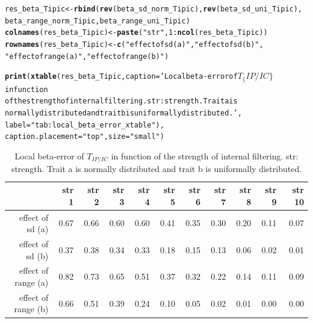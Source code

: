 \documentclass[12pt]{article}\usepackage[]{graphicx}\usepackage[]{color}
\makeatletter
\newcommand{\hlnum}[1]{\textcolor[rgb]{0.686,0.059,0.569}{#1}}%
\newcommand{\hlstr}[1]{\textcolor[rgb]{0.192,0.494,0.8}{#1}}%
\newcommand{\hlopt}[1]{\textcolor[rgb]{0,0,0}{#1}}%
\newcommand{\hlstd}[1]{\textcolor[rgb]{0.345,0.345,0.345}{#1}}%
\newcommand{\hlkwb}[1]{\textcolor[rgb]{0.69,0.353,0.396}{#1}}%
\newcommand{\hlkwc}[1]{\textcolor[rgb]{0.333,0.667,0.333}{#1}}%
\newcommand{\hlkwd}[1]{\textcolor[rgb]{0.737,0.353,0.396}{\textbf{#1}}}%
\newenvironment{kframe}{%
 \def\at@end@of@kframe{}%
 \ifinner\ifhmode%
  \def\at@end@of@kframe{\end{minipage}}%
  \begin{minipage}{\columnwidth}%
 \fi\fi%
 \def\FrameCommand##1{\hskip\@totalleftmargin \hskip-\fboxsep
 \colorbox{shadecolor}{##1}\hskip-\fboxsep
     \hskip-\linewidth \hskip-\@totalleftmargin \hskip\columnwidth}%
 \MakeFramed {\advance\hsize-\width
   \@totalleftmargin\z@ \linewidth\hsize
   \@setminipage}}%
 {\par\unskip\endMakeFramed%
 \at@end@of@kframe}
\newenvironment{knitrout}{}{} %
\makeatother
\begin{document}
\begin{knitrout}
\begin{kframe}
\begin{alltt}
\hlstd{res_beta_Tipic} \hlkwb{<-} \hlkwd{rbind}\hlstd{(}\hlkwd{rev}\hlstd{(beta_sd_norm_Tipic),} \hlkwd{rev}\hlstd{(beta_sd_uni_Tipic),}
      \hlstd{beta_range_norm_Tipic, beta_range_uni_Tipic)}
\hlkwd{colnames}\hlstd{(res_beta_Tipic)} \hlkwb{<-} \hlkwd{paste}\hlstd{(}\hlstr{"str"}\hlstd{,} \hlnum{1}\hlopt{:}\hlkwd{ncol}\hlstd{(res_beta_Tipic))}
\hlkwd{rownames}\hlstd{(res_beta_Tipic)} \hlkwb{<-} \hlkwd{c}\hlstd{(}\hlstr{"effect of sd (a)"}\hlstd{,} \hlstr{"effect of sd (b)"}\hlstd{,}
        \hlstr{"effect of range (a)"}\hlstd{,} \hlstr{"effect of range (b)"}\hlstd{)}
\end{alltt}
\end{kframe}
\end{knitrout}

\begin{kframe}
\begin{alltt}
\hlkwd{print}\hlstd{(}\hlkwd{xtable}\hlstd{(res_beta_Tipic,} \hlkwc{caption} \hlstd{=} \hlstr{'Local beta-error of $T_\{IP/IC\}$ in function 
             of the strength of internal filtering. str: strength. Trait a is 
             normally distributed and trait b is uniformally distributed.'}\hlstd{,}
             \hlkwc{label} \hlstd{=} \hlstr{"tab:local_beta_error_xtable"}\hlstd{),}
      \hlkwc{caption.placement} \hlstd{=} \hlstr{"top"}\hlstd{,} \hlkwc{size} \hlstd{=} \hlstr{"small"}\hlstd{)}
\end{alltt}
\end{kframe}%
\begin{table}[ht]
\centering
\caption{Local beta-error of $T_{IP/IC}$ in function 
             of the strength of internal filtering. str: strength. Trait a is 
             normally distributed and trait b is uniformally distributed.} 
\label{tab:local_beta_error_xtable}
{\small
\begin{tabular}{rrrrrrrrrrr}
  \hline
 & str 1 & str 2 & str 3 & str 4 & str 5 & str 6 & str 7 & str 8 & str 9 & str 10 \\ 
  \hline
effect of sd (a) & 0.67 & 0.66 & 0.60 & 0.60 & 0.41 & 0.35 & 0.30 & 0.20 & 0.11 & 0.07 \\ 
  effect of sd (b) & 0.37 & 0.38 & 0.34 & 0.33 & 0.18 & 0.15 & 0.13 & 0.06 & 0.02 & 0.01 \\ 
  effect of range (a) & 0.82 & 0.73 & 0.65 & 0.51 & 0.37 & 0.32 & 0.22 & 0.14 & 0.11 & 0.09 \\ 
  effect of range (b) & 0.66 & 0.51 & 0.39 & 0.24 & 0.10 & 0.05 & 0.02 & 0.01 & 0.00 & 0.00 \\ 
   \hline
\end{tabular}
}
\end{table}
\end{document}
